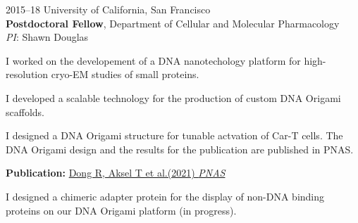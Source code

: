 \documentclass[12pt,letterpaper]{report}
\newcommand{\listitemspace}{0.25em}
\renewenvironment{itemize}
{\begin{list}{}{\setlength{\leftmargin}{0em}
                \setlength{\parskip}{0em}
                \setlength{\itemsep}{\listitemspace}
                \setlength{\parsep}{\listitemspace}}}
{\end{list}}
\begin{document}
\begin{tablist}
        \item[2015--18]\tab{}University of California, San Francisco \\
                             \textbf{Postdoctoral Fellow}, Department of Cellular and Molecular Pharmacology \\
                             \textit{PI}: Shawn Douglas
                             \begin{itemize}
                                \item \textbullet \hspace{0.2cm} I worked on the developement of a DNA nanotechology platform for high-resolution cryo-EM studies of small proteins.
                                \item \textbullet \hspace{0.2cm} I developed a scalable technology for the production of custom DNA Origami scaffolds.
                                \item \textbullet \hspace{0.2cm} I designed a DNA Origami structure for tunable actvation of Car-T cells. The DNA Origami design and the results for the publication are published in PNAS.
                                \begin{itemize}
                                    \item \hspace{1cm} \textbf{Publication:} \href{https://doi.org/10.1073/pnas.2109057118}{Dong R, Aksel T et al.(2021) \textit{PNAS}}
                                \end{itemize}
                                \item \textbullet \hspace{0.2cm} I designed a chimeric adapter protein for the display of non-DNA binding proteins on our DNA Origami platform (in progress).
                            \end{itemize}


\end{tablist}
\end{document}
